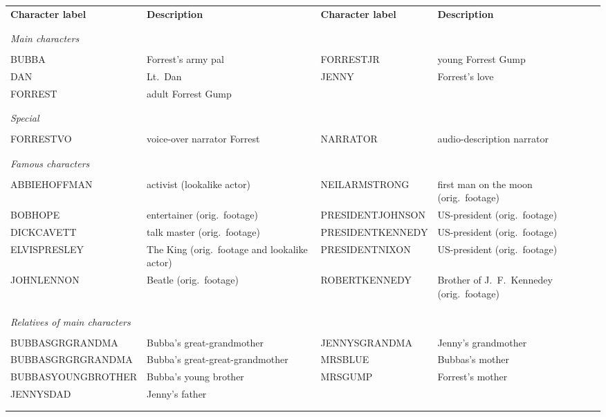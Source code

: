 \begin{table}
  \centering
  \begin{tabular}{p{4cm}p{4cm}p{3.6cm}p{4cm}}
    \textbf{Character label} & \textbf{Description} & \textbf{Character label} & \textbf{Description} \\
\\\hline\\

\multicolumn{4}{l}{\textit{Main characters}} \\\\
BUBBA     & Forrest's army pal & FORRESTJR & young Forrest Gump \\
DAN       & Lt.~Dan & JENNY     & Forrest's love \\
FORREST   & adult Forrest Gump &           & \\
\\\hline\\

\multicolumn{4}{l}{\textit{Special}} \\\\
FORRESTVO & voice-over narrator Forrest & NARRATOR & audio-description narrator \\
\\\hline\\

\multicolumn{4}{l}{\textit{Famous characters}} \\\\
 ABBIEHOFFMAN     & activist (lookalike actor)                   & NEILARMSTRONG    & first man on the moon (orig.~footage) \\ 
 BOBHOPE          & entertainer (orig.~footage)                  & PRESIDENTJOHNSON & US-president (orig.~footage) \\
 DICKCAVETT       & talk master (orig.~footage)                  & PRESIDENTKENNEDY & US-president (orig.~footage) \\
 ELVISPRESLEY     & The King (orig.~footage and lookalike actor) & PRESIDENTNIXON   & US-president (orig.~footage)  \\
 JOHNLENNON       & Beatle (orig.~footage)                       & ROBERTKENNEDY    & Brother of J.~F.~Kennedey (orig.~footage) \\                  & \\
\\\hline\\

\multicolumn{4}{l}{\textit{Relatives of main characters}} \\\\
BUBBASGRGRANDMA   & Bubba's great-grandmother & JENNYSGRANDMA & Jenny's grandmother\\
BUBBASGRGRGRANDMA & Bubba's great-great-grand\-mother & MRSBLUE       & Bubbas's mother\\
BUBBASYOUNGBROTHER      & Bubba's young brother & MRSGUMP       & Forrest's mother \\
JENNYSDAD               & Jenny's father &              & \\
\\\hline\\


\end{tabular}
\end{table}

